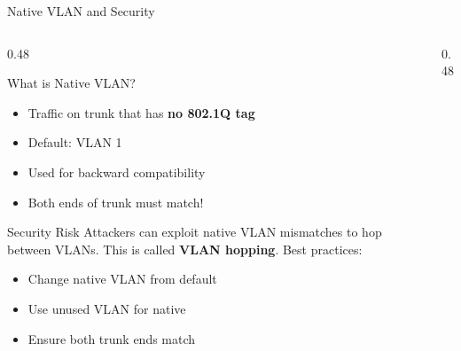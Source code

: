 \documentclass[aspectratio=169]{beamer}  %
\begin{document}
\begin{frame}{Native VLAN and Security}
    \begin{columns}[T]
        \begin{column}{0.48\textwidth}
            \begin{block}{What is Native VLAN?}
                \small
                \begin{itemize}\setlength{\itemsep}{2pt}
                    \item Traffic on trunk that has \textbf{no 802.1Q tag}
                    \item Default: VLAN 1
                    \item Used for backward compatibility
                    \item Both ends of trunk must match!
                \end{itemize}
            \end{block}
            
            \vspace{0.2em}
            \begin{alertblock}{Security Risk}
                \small
                Attackers can exploit native VLAN mismatches to hop between VLANs. This is called \textbf{VLAN hopping}. Best practices:
                \begin{itemize}
                    \scriptsize
                    \item Change native VLAN from default
                    \item Use unused VLAN for native
                    \item Ensure both trunk ends match
                \end{itemize}
            \end{alertblock}
        \end{column}
        \begin{column}{0.48\textwidth}
            \begin{center}
\end{center}
\end{column}
\end{columns}
\end{frame}
\end{document}
